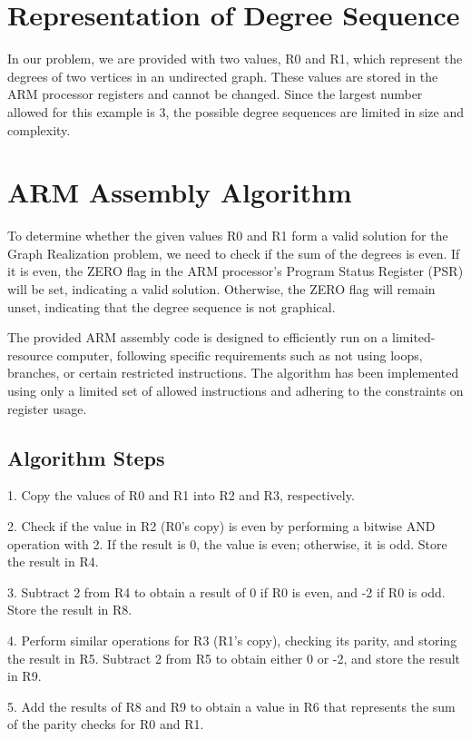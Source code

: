 \section{Representation of Degree Sequence}

In our problem, we are provided with two values, R0 and R1, which represent the degrees of two vertices in an undirected graph. These values are stored in the ARM processor registers and cannot be changed. Since the largest number allowed for this example is 3, the possible degree sequences are limited in size and complexity.

\section{ARM Assembly Algorithm}

To determine whether the given values R0 and R1 form a valid solution for the Graph Realization problem, we need to check if the sum of the degrees is even. If it is even, the ZERO flag in the ARM processor's Program Status Register (PSR) will be set, indicating a valid solution. Otherwise, the ZERO flag will remain unset, indicating that the degree sequence is not graphical.

The provided ARM assembly code is designed to efficiently run on a limited-resource computer, following specific requirements such as not using loops, branches, or certain restricted instructions. The algorithm has been implemented using only a limited set of allowed instructions and adhering to the constraints on register usage.

\subsection{Algorithm Steps}

1. Copy the values of R0 and R1 into R2 and R3, respectively.

2. Check if the value in R2 (R0's copy) is even by performing a bitwise AND operation with 2. If the result is 0, the value is even; otherwise, it is odd. Store the result in R4.

3. Subtract 2 from R4 to obtain a result of 0 if R0 is even, and -2 if R0 is odd. Store the result in R8.

4. Perform similar operations for R3 (R1's copy), checking its parity, and storing the result in R5. Subtract 2 from R5 to obtain either 0 or -2, and store the result in R9.

5. Add the results of R8 and R9 to obtain a value in R6 that represents the sum of the parity checks for R0 and R1.


